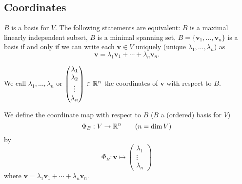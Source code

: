 \documentclass[10pt, a4paper]{article}
\newcommand{\mbf}[1]{\mathbf{#1}}
\begin{document}
\subsection{Coordinates}
$B$ is a basis for $V$.
The following statements are equivalent:
$B$ is a maximal linearly independent subset,
$B$ is a minimal spanning set,
$B = \{\mbf{v}_1, \dotsc, \mbf{v}_n\}$ is a basis if and only if we can write each $\mbf{v} \in V$ uniquely
(unique $\lambda_1, \dotsc, \lambda_n$)
as
\[
\mbf{v} = \lambda_1\mbf{v}_1 + \dotsi + \lambda_n\mbf{v}_n.
\]

We call $\lambda_1, \dotsc, \lambda_n$ or
$
\begin{pmatrix}
    \lambda_1 \\ \lambda_2 \\ \vdots \\ \lambda_n
\end{pmatrix} \in \mathbb{R} ^ n
$
the coordinates of $\mbf{v}$ with respect to $B$.

\begin{definition}
    We define the coordinate map with respect to $B$
    ($B$ a 
    (ordered)
    basis for $V$)
    \[
    \Phi_B : V \rightarrow \mathbb{R} ^ n\qquad\text{($n = \dim{V}$)}
    \]
    by
    \[
    \Phi_B : \mbf{v} \mapsto \begin{pmatrix}
        \lambda_1 \\ \vdots \\ \lambda_n
    \end{pmatrix}
    \]
    where $\mbf{v} = \lambda_1\mbf{v}_1 + \dotsi + \lambda_n\mbf{v}_n$.
\end{definition}
\end{document}
